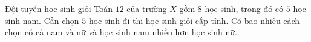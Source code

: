 \begin{bt}%
Đội tuyển học sinh giỏi Toán $12$ của trường $X$ gồm $8$ học sinh, trong đó có $5$ học sinh nam. Cần chọn $5$ học sinh đi thi học sinh giỏi cấp tỉnh. Có bao nhiêu cách chọn có cả nam và nữ và học sinh nam nhiều hơn học sinh nữ.
\end{bt}